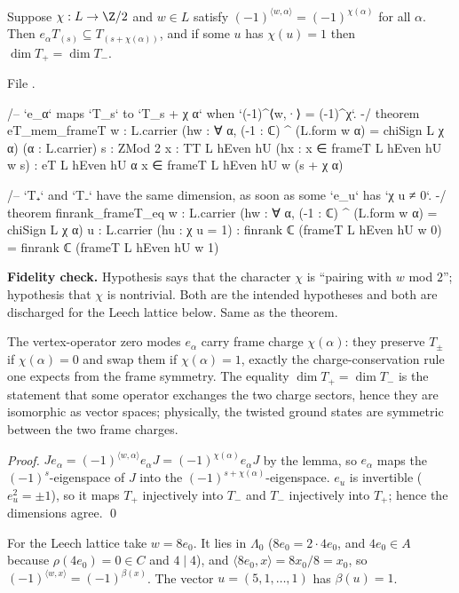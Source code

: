 \begin{theorem}\label{ch11:thm:frameT}
Suppose $\chi:L\to\Z/2$ and $w\in L$ satisfy $(-1)^{\langle w,\alpha\rangle}=(-1)^{\chi(\alpha)}$
for all $\alpha$.  Then $e_\alpha T_{(s)}\subseteq T_{(s+\chi(\alpha))}$, and if some $u$ has
$\chi(u)=1$ then $\dim T_+=\dim T_-$.
\end{theorem}
\noindent File .
\begin{leancode}
/-- `e_α` maps `T_s` to `T_{s + χ α}` when `(-1)^{⟨w,·⟩} = (-1)^{χ}`. -/
theorem eT_mem_frameT {w : L.carrier} (hw : ∀ α, (-1 : ℂ) ^ (L.form w α) = chiSign L χ α)
    (α : L.carrier) {s : ZMod 2} {x : TT L hEven hU} (hx : x ∈ frameT L hEven hU w s) :
    eT L hEven hU α x ∈ frameT L hEven hU w (s + χ α)

/-- `T₊` and `T₋` have the same dimension, as soon as some `e_u` has `χ u ≠ 0`. -/
theorem finrank_frameT_eq {w : L.carrier} (hw : ∀ α, (-1 : ℂ) ^ (L.form w α) = chiSign L χ α)
    {u : L.carrier} (hu : χ u = 1) :
    finrank ℂ (frameT L hEven hU w 0) = finrank ℂ (frameT L hEven hU w 1)
\end{leancode}
\begin{dictionary}
\textbf{Fidelity check.}  Hypothesis  says that the character $\chi$ is ``pairing with
$w$ mod $2$''; hypothesis  that $\chi$ is nontrivial.  Both are the intended hypotheses
and both are discharged for the Leech lattice below.  Same as the theorem.
\end{dictionary}

\begin{physics}
The vertex-operator zero modes $e_\alpha$ carry frame charge $\chi(\alpha)$: they preserve $T_\pm$ if $\chi(\alpha)=0$ and swap them if $\chi(\alpha)=1$, exactly the charge-conservation rule one expects from the frame symmetry. The equality $\dim T_+=\dim T_-$ is the statement that some operator exchanges the two charge sectors, hence they are isomorphic as vector spaces; physically, the twisted ground states are symmetric between the two frame charges.
\end{physics}
\emph{Proof.}  $Je_\alpha=(-1)^{\langle w,\alpha\rangle}e_\alpha J=(-1)^{\chi(\alpha)}e_\alpha J$ by the
lemma, so $e_\alpha$ maps the $(-1)^s$-eigenspace of $J$ into the $(-1)^{s+\chi(\alpha)}$-eigenspace.
$e_u$ is invertible ($e_u^2=\pm1$), so it maps $T_+$ injectively into $T_-$ and $T_-$ injectively into
$T_+$; hence the dimensions agree. \qed

For the Leech lattice take $w=8e_0$.  It lies in $\Lambda_0$ ($8e_0=2\cdot4e_0$, and $4e_0\in A$
because $\rho(4e_0)=0\in C$ and $4\mid4$), and $\langle 8e_0,x\rangle=8x_0/8=x_0$, so
$(-1)^{\langle w,x\rangle}=(-1)^{\beta(x)}$.  The vector $u=(5,1,\ldots,1)$ has $\beta(u)=1$.

